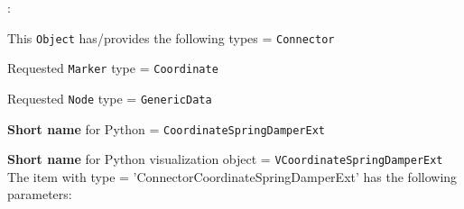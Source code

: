 \noindent {}:
\bi
  \item This \texttt{Object} has/provides the following types = \texttt{Connector}
  \item Requested \texttt{Marker} type = \texttt{Coordinate}
  \item Requested \texttt{Node} type = \texttt{GenericData}
  \item {\bf Short name} for Python = \texttt{CoordinateSpringDamperExt}
  \item {\bf Short name} for Python visualization object = \texttt{VCoordinateSpringDamperExt}
\ei\vspace{12pt} \noindent 
The item  with type = 'ConnectorCoordinateSpringDamperExt' has the following parameters:
\vspace{-0.5cm}\\
\vspace{-0.5cm}\\
